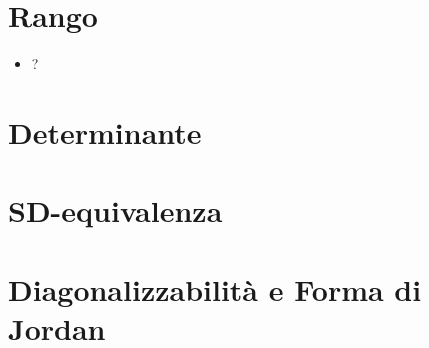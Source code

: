 \documentclass[a4paper,NoNotes,GeneralMath]{stdmdoc}
\begin{document}
	\section*{Rango}
	\begin{itemize}
		\item ?
	\end{itemize}

	\section*{Determinante}


	\section*{SD-equivalenza}
	
	
	\section*{Diagonalizzabilità e Forma di Jordan}
\end{document}
